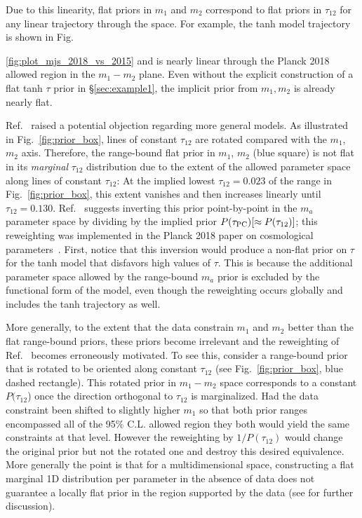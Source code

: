 \documentclass[prd,twocolumn,amsmath,amssymb,floatfix,superscriptaddress,nofootinbib]{revtex4-1}
\begin{document}
Due to this linearity, flat priors in $m_1$ and $m_2$ correspond to
flat priors in $\tau_{12}$ for any linear trajectory through the space.   For example, the tanh model trajectory is shown in Fig.~{\ref{fig:plot_mjs_2018_vs_2015} and is nearly linear through the Planck 2018 allowed region in the $m_1-m_2$ plane.  Even without the explicit 
construction of a flat tanh $\tau$ prior in \S \ref{sec:example1}, 
the implicit prior from $m_1,m_2$ is already nearly flat. 

Ref.~\cite{Millea:2018bko} raised a potential objection regarding more general models.  As illustrated in Fig.~\ref{fig:prior_box}, lines of constant $\tau_{12}$ are rotated compared with the $m_1$,
$m_2$ axis.  Therefore, the range-bound flat prior in $m_1$, $m_2$ (blue square)  is not flat in its {\it marginal} $\tau_{12}$  distribution due to the extent  of the allowed parameter space along lines of constant $\tau_{12}$: At 
the implied lowest $\tau_{12}=0.023$ of the range
in Fig.~\ref{fig:prior_box},
this extent vanishes and then increases linearly until $\tau_{12} = 0.130$.
 Ref.~\cite{Millea:2018bko} suggests 
inverting this prior point-by-point in the $m_a$ parameter space by dividing by the implied prior $P(\tau_{\rm PC}) [ \approx P(\tau_{12})]$; this reweighting was implemented in the Planck 2018 paper on cosmological parameters~\cite{Aghanim:2018eyx}.
First, notice that this inversion would 
produce a non-flat prior on $\tau$ for the tanh model
that disfavors high values of $\tau$.   This is because
the additional parameter space allowed by the range-bound $m_a$ prior is excluded by the functional form of the model, even though the reweighting occurs globally and includes the tanh trajectory as well. 

More generally, to the extent that the data constrain $m_1$ and $m_2$ better than the flat range-bound priors, these priors become irrelevant and the reweighting of Ref.~\cite{Millea:2018bko} becomes erroneously motivated.   To see this, consider a range-bound prior that is rotated to be oriented along constant $\tau_{12}$ (see Fig.~\ref{fig:prior_box}, blue dashed rectangle). This rotated prior in $m_1-m_2$ space corresponds to a constant $P(\tau_{12}$) once the direction orthogonal to $\tau_{12}$ is marginalized.
Had the data constraint been shifted to slightly higher
$m_1$ so that both prior ranges encompassed all of the 95\% C.L. allowed
region they both would yield  the same constraints at that level.
However the reweighting by $1/P(\tau_{12})$ would change the original prior but not the rotated one and destroy this desired equivalence. 
More generally the point is that for a multidimensional space, constructing a flat marginal 1D distribution per parameter in the absence of data does not guarantee a locally flat prior in the region supported by the data
(see \cite{Heinrich:2018btc} for further discussion).

}
\end{document}
